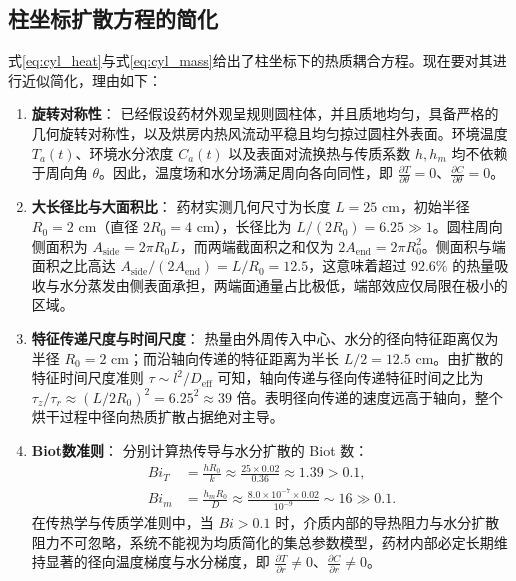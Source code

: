 \documentclass[12pt,a4paper,fontset=none]{ctexart}
\begin{document}
\subsection{柱坐标扩散方程的简化}
式\eqref{eq:cyl_heat}与式\eqref{eq:cyl_mass}给出了柱坐标下的热质耦合方程。现在要对其进行近似简化，理由如下：
\begin{enumerate}[label=(\arabic*)]
  \item \textbf{旋转对称性}：
  已经假设药材外观呈规则圆柱体，并且质地均匀，具备严格的几何旋转对称性，以及烘房内热风流动平稳且均匀掠过圆柱外表面。环境温度 $T_a(t)$、环境水分浓度 $C_a(t)$ 以及表面对流换热与传质系数 $h, h_m$ 均不依赖于周向角 $\theta$。因此，温度场和水分场满足周向各向同性，即 $\frac{\partial T}{\partial\theta}=0$、$\frac{\partial C}{\partial\theta}=0$。

  \item \textbf{大长径比与大面积比}：
  药材实测几何尺寸为长度 $L=25\text{ cm}$，初始半径 $R_0=2\text{ cm}$（直径 $2R_0=4\text{ cm}$），长径比为 $L/(2R_0)=6.25\gg1$。圆柱周向侧面积为 $A_{\text{side}}=2\pi R_0 L$，而两端截面积之和仅为 $2A_{\text{end}}=2\pi R_0^2$。侧面积与端面积之比高达 $A_{\text{side}}/(2A_{\text{end}})=L/R_0=12.5$，这意味着超过 $92.6\%$ 的热量吸收与水分蒸发由侧表面承担，两端面通量占比极低，端部效应仅局限在极小的区域。

  \item \textbf{特征传递尺度与时间尺度}：
  热量由外周传入中心、水分的径向特征距离仅为半径 $R_0=2\text{ cm}$；而沿轴向传递的特征距离为半长 $L/2=12.5\text{ cm}$。由扩散的特征时间尺度准则 $\tau \sim l^2/D_{\text{eff}}$ 可知，轴向传递与径向传递特征时间之比为 $\tau_z/\tau_r \approx (L/2R_0)^2 = 6.25^2 \approx 39$ 倍。表明径向传递的速度远高于轴向，整个烘干过程中径向热质扩散占据绝对主导。

  \item \textbf{Biot数准则}：
  分别计算热传导与水分扩散的 Biot 数：
  \begin{align}
  Bi_T &= \frac{h R_0}{k} \approx \frac{25 \times 0.02}{0.36} \approx 1.39 > 0.1,\label{eq:biot_t}\\
  Bi_m &= \frac{h_m R_0}{D} \approx \frac{8.0\times 10^{-7} \times 0.02}{10^{-9}} \sim 16 \gg 0.1.\label{eq:biot_m}
  \end{align}
  在传热学与传质学准则中，当 $Bi > 0.1$ 时，介质内部的导热阻力与水分扩散阻力不可忽略，系统不能视为均质简化的集总参数模型，药材内部必定长期维持显著的径向温度梯度与水分梯度，即 $\frac{\partial T}{\partial r}\neq0$、$\frac{\partial C}{\partial r}\neq0$。
\end{enumerate}
\end{document}
